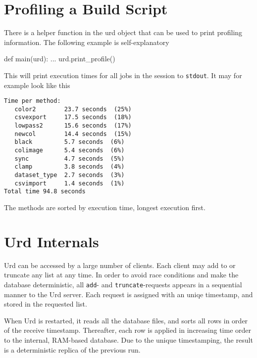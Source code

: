 \section{Profiling a Build Script}
There is a helper function in the urd object that can be used to print
profiling information.  The following example is self-explanatory
\begin{python}
def main(urd):
    ...
    urd.print_profile()
\end{python}
This will print execution times for all jobs in the session
to \texttt{stdout}.  It may for example look like this
\begin{verbatim}
Time per method:
   color2        23.7 seconds  (25%)
   csvexport     17.5 seconds  (18%)
   lowpass2      15.6 seconds  (17%)
   newcol        14.4 seconds  (15%)
   black         5.7 seconds  (6%)
   colimage      5.4 seconds  (6%)
   sync          4.7 seconds  (5%)
   clamp         3.8 seconds  (4%)
   dataset_type  2.7 seconds  (3%)
   csvimport     1.4 seconds  (1%)
Total time 94.8 seconds
\end{verbatim}
The methods are sorted by execution time, longest execution first.



\clearpage
\section{Urd Internals}
Urd can be accessed by a large number of clients.  Each client may add
to or truncate any list at any time.  In order to avoid race
conditions and make the database deterministic, all \texttt{add}-
and \texttt{truncate}-requests appears in a sequential manner to the
Urd server.  Each request is assigned with an uniqe timestamp, and
stored in the requested list.

When Urd is restarted, it reads all the database files, and sorts all
rows in order of the receive timestamp.  Thereafter, each row is
applied in increasing time order to the internal, RAM-based database.
Due to the unique timestamping, the result is a deterministic replica
of the previous run.
